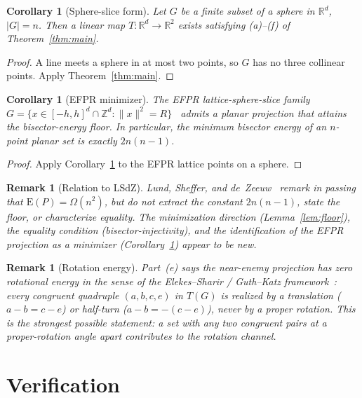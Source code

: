 \documentclass[12pt]{article}
\newtheorem{corollary}[theorem]{Corollary}
\newtheorem{remark}[theorem]{Remark}
\newcommand{\R}{\mathbb{R}}
\newcommand{\Z}{\mathbb{Z}}
\newcommand{\E}{\mathrm{E}}         %
\newcommand{\norm}[1]{\|#1\|}
\begin{document}
\begin{corollary}[Sphere-slice form]
\label{cor:sphere}
Let $G$ be a finite subset of a sphere in $\R^d$, $|G|=n$.  Then a linear map
$T\colon\R^d\to\R^2$ exists satisfying {\rm(a)}--{\rm(f)} of
Theorem~\ref{thm:main}.
\end{corollary}

\begin{proof}
A line meets a sphere in at most two points, so $G$ has no three collinear
points.  Apply Theorem~\ref{thm:main}.
\end{proof}

\begin{corollary}[EFPR minimizer]
The EFPR lattice-sphere-slice family $G = \{x\in[-h,h]^d\cap\Z^d :
\norm{x}^2=R\}$~\cite{EFPR93} admits a planar projection that attains the
bisector-energy floor.  In particular, the minimum bisector energy of an
$n$-point planar set is exactly $2n(n-1)$.
\end{corollary}

\begin{proof}
Apply Corollary~\ref{cor:sphere} to the EFPR lattice points on a sphere.
\end{proof}

\begin{remark}[Relation to LSdZ]
Lund, Sheffer, and de~Zeeuw~\cite{LSdZ16} remark in passing that
$\E(P) = \Omega(n^2)$, but do not extract the constant $2n(n-1)$, state the
floor, or characterize equality.
The minimization direction (Lemma~\ref{lem:floor}), the equality condition
(bisector-injectivity), and the identification of the EFPR projection as
a minimizer (Corollary~\ref{cor:sphere}) appear to be new.
\end{remark}

\begin{remark}[Rotation energy]
Part~(e) says the near-enemy projection has zero rotational energy in the
sense of the Elekes--Sharir / Guth--Katz framework~\cite{ES11,GK15}: every
congruent quadruple $(a,b,c,e)$ in $T(G)$ is realized by a translation
($a-b=c-e$) or half-turn ($a-b=-(c-e)$), never by a proper rotation.
This is the strongest possible statement: a set with any two congruent pairs
at a proper-rotation angle apart contributes to the rotation channel.
\end{remark}

\section{Verification}
\end{document}
